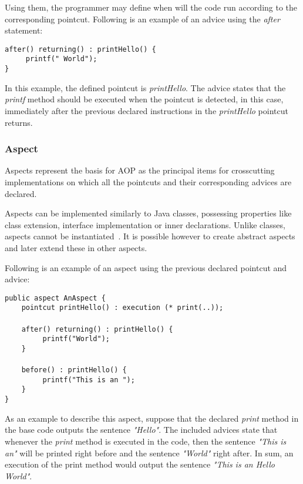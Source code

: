 \documentclass{template}
\begin{document}
Using them, the programmer may define when will the code run according to the corresponding pointcut. Following is an example of an advice using the \textit{after} statement:

\verb!after() returning() : printHello() {!\\
\verb!     printf(" World");!\\
\verb!}!

In this example, the defined pointcut is \textit{printHello}. The advice states that the \textit{printf} method should be executed when the pointcut is detected, in this case, immediately after the previous declared instructions in the \textit{printHello} pointcut returns.

\subsubsection{Aspect}

Aspects represent the basis for AOP as the principal items for crosscutting implementations on which all the pointcuts and their corresponding advices are declared. 

Aspects can be implemented similarly to Java classes, possessing properties like class extension, interface implementation or inner declarations. Unlike classes, aspects cannot be instantiated~\cite{Kiselev2002}. It is possible however to create abstract aspects and later extend these in other aspects.

Following is an example of an aspect using the previous declared pointcut and advice:

\verb!public aspect AnAspect {!\\
\verb!    pointcut printHello() : execution (* print(..));!\\\\
\verb!    after() returning() : printHello() {!\\
\verb!         printf("World");!\\
\verb!    }!\\\\
\verb!    before() : printHello() {!\\
\verb!         printf("This is an ");!\\
\verb!    }!\\
\verb!}!

As an example to describe this aspect, suppose that the declared \textit{print} method in the base code outputs the sentence \textit{"Hello"}. The included advices state that whenever the \textit{print} method is executed in the code, then the sentence \textit{"This is an"} will be printed right before and the sentence \textit{"World"} right after. In sum, an execution of the print method would output the sentence \textit{"This is an Hello World"}.
\end{document}
